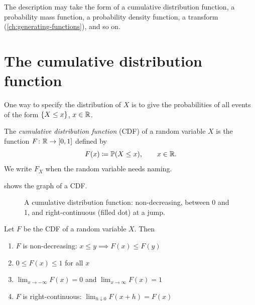 The description may take the form of a cumulative distribution function, a probability mass function, a probability density function, a transform (\cref{ch:generating-functions}), and so on.

\section{The cumulative distribution function}\label{sec:cdf}

One way to specify the distribution of $X$ is to give the probabilities of all events of the form $\left\{ X \le x \right\}$, $x \in \mathbb{R}$.

\begin{definition}\label{def:cdf}
The \emph{cumulative distribution function} (CDF) of a random variable $X$ is the function $F \colon \mathbb{R} \to [0, 1]$ defined by
\[
  F(x) \coloneqq \mathbb{P}(X \le x), \qquad x \in \mathbb{R}.
\]
We write $F_X$ when the random variable needs naming.
\end{definition}

 shows the graph of a CDF.

\begin{figure}[H]
\centering
{}
\caption{A cumulative distribution function: non-decreasing, between 0 and 1, and right-continuous (filled dot) at a jump.}
\label{fig:generic-cdf}
\end{figure}

\begin{theorem}\label{thm:cdf-properties}
Let $F$ be the CDF of a random variable $X$. Then
\begin{enumerate}[label=(\roman*)]
  \item $F$ is non-decreasing: $x \le y \implies F(x) \le F(y)$
  \item $0 \le F(x) \le 1$ for all $x$
  \item $\lim_{x \to -\infty} F(x) = 0$ and $\lim_{x \to \infty} F(x) = 1$
  \item $F$ is right-continuous: $\lim_{h \downarrow 0} F(x + h) = F(x)$
\end{enumerate}
\end{theorem}

